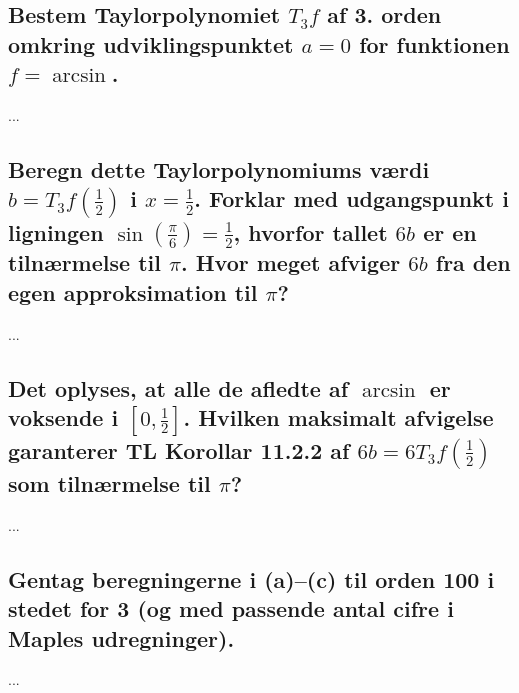 \documentclass[11pt,a4paper]{article}
\newcommand{\half}{\frac{1}{2}}
\begin{document}
\subsection
{
    \mdseries
    Bestem Taylorpolynomiet $T_3 f$ af 3. orden omkring udviklingspunktet
    $a = 0$ for funktionen $f = \arcsin$.
}
...

\subsection
{
    \mdseries
    Beregn dette Taylorpolynomiums værdi $b = T_3 f (\half)$ i $x = \half$.
    Forklar med udgangspunkt i ligningen $\sin(\frac{\pi}{6}) = \half$,
    hvorfor tallet $6b$ er en tilnærmelse til $\pi$. Hvor meget afviger $6b$
    fra den egen approksimation til $\pi$?
}
...

\subsection
{
    \mdseries
    Det oplyses, at alle de afledte af $\arcsin$ er voksende i $[0,\half]$.
    Hvilken maksimalt afvigelse garanterer TL Korollar 11.2.2 af $6b = 6T_3
    f(\half)$ som tilnærmelse til $\pi$?
}
...

\subsection
{
    \mdseries
    Gentag beregningerne i (a)--(c) til orden 100 i stedet for 3 (og med
    passende antal cifre i Maples udregninger).
}
...
\end{document}
